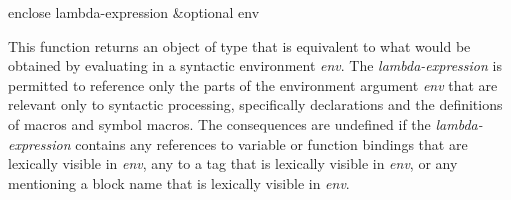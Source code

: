 \begin{newer}
\begin{defun}[Function]
enclose lambda-expression &optional env

  This function returns an object of type  that is equivalent to what
  would be obtained by evaluating 
  in a syntactic
  environment {\it env}.  The {\it lambda-expression} is permitted to reference only the
  parts of the environment argument {\it env} that are relevant only to syntactic
  processing, specifically declarations and the definitions of macros and
  symbol macros.  The consequences are undefined if the {\it lambda-expression}
  contains any references to variable or function bindings that are 
  lexically visible in {\it env}, any  to a tag that is lexically visible in 
  {\it env}, or any  mentioning a block name that is lexically 
  visible in {\it env}.
\end{defun}  
\end{newer}
